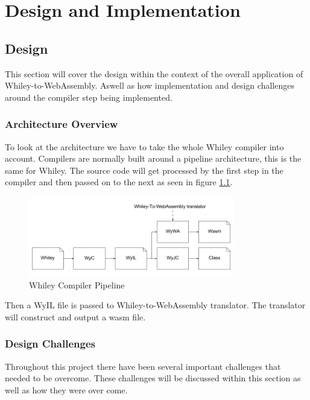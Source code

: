 \chapter{Design and Implementation}\label{C:di}

\section{Design}
This section will cover the design within the context of the overall application of Whiley-to-WebAssembly. Aswell as how implementation and design challenges around the compiler step being implemented.

\subsection{Architecture Overview}

To look at the architecture we have to take the whole Whiley compiler into account. Compilers are normally built around a pipeline architecture, this is the same for Whiley. The source code will get processed by the first step in the compiler and then passed on to the next as seen in figure \ref{fig:arc}. 

\begin{figure}[H]
  \centering
  \includegraphics[width=0.8\textwidth]{My_Preposed_Extention}
  \caption{Whiley Compiler Pipeline}
  \label{fig:arc}
\end{figure}

Then a WyIL file is passed to Whiley-to-WebAssembly translator. The translator will construct and output a wasm file. 


\subsection{Design Challenges}\label{subsec:didc}

Throughout this project there have been several important challenges that needed to be overcome. These challenges will be discussed within this section as well as how they were over come. 

